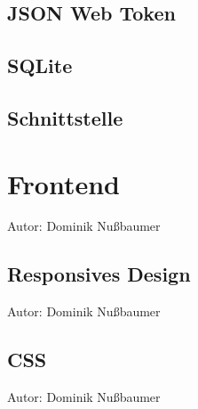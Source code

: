 \documentclass[
    headings=optiontotocandhead,%
    twoside,
    numbers=noenddot,%
    toc=flat, %
    12pt, %
    titlepage, %
    parskip=full, %
    listof=totoc, %
    listof=flat, %
    numbers=noenddot, %
    bibliography=totoc, %
    a4paper,DIV=14,
    BCOR=15mm,
]{scrbook}
\begin{document}
\renewcommand{\kapitelautor}{Autor: Clemens Scharwitzl}



\section{JSON Web Token}\label{JWT}

\renewcommand{\kapitelautor}{Autor: Clemens Scharwitzl}



\section{SQLite}\label{SQLite}

\renewcommand{\kapitelautor}{Autor: Clemens Scharwitzl}



\section{Schnittstelle}\label{Schnittstelle}

\renewcommand{\kapitelautor}{Autor: Clemens Scharwitzl}

% 

\chapter{Frontend}\label{Frontend}

    {Autor: Dominik Nußbaumer}


\section{Responsives Design}\label{Responsives Design}

    {Autor: Dominik Nußbaumer}

\section{CSS}\label{CSS}

\renewcommand{\kapitelautor}{Autor: Dominik Nußbaumer}

    {Autor: Dominik Nußbaumer}
\end{document}
